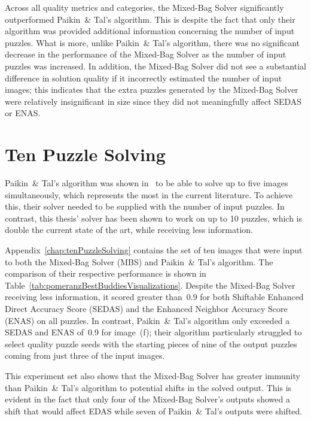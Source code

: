 Across all quality metrics and categories, the Mixed-Bag Solver significantly outperformed Paikin~\& Tal's algorithm.  This is despite the fact that only their algorithm was provided additional information concerning the number of input puzzles.  What is more, unlike Paikin~\& Tal's algorithm, there was no significant decrease in the performance of the Mixed-Bag Solver as the number of input puzzles was increased.  In addition, the Mixed-Bag Solver did not see a substantial difference in solution quality if it incorrectly estimated the number of input images; this indicates that the extra puzzles generated by the Mixed-Bag Solver were relatively insignificant in size since they did not meaningfully affect SEDAS or ENAS.  

\section{Ten Puzzle Solving}

Paikin~\& Tal's algorithm was shown in~\cite{paikin2015} to be able to solve up to five images simultaneously, which represents the most in the current literature.  To achieve this, their solver needed to be supplied with the number of input puzzles.  In contrast, this thesis' solver has been shown to work on up to 10 puzzles, which is double the current state of the art, while receiving less information.

Appendix~\ref{chap:tenPuzzleSolving} contains the set of ten images that were input to both the Mixed-Bag Solver (MBS) and Paikin~\& Tal's algorithm.  The comparison of their respective performance is shown in Table~\ref{tab:pomeranzBestBuddiesVisualizations}.  Despite the Mixed-Bag Solver receiving less information, it scored greater than~0.9 for both Shiftable Enhanced Direct Accuracy Score (SEDAS) and the Enhanced Neighbor Accuracy Score (ENAS) on all puzzles.  In contrast, Paikin~\& Tal's algorithm only exceeded a SEDAS and ENAS of~0.9 for image~(f); their algorithm particularly struggled to select quality puzzle seeds with the starting pieces of nine of the output puzzles coming from just three of the input images.

This experiment set also shows that the Mixed-Bag Solver has greater immunity than Paikin~\& Tal's algorithm to potential shifts in the solved output.  This is evident in the fact that only four of the Mixed-Bag Solver's outputs showed a shift that would affect EDAS while seven of Paikin~\& Tal's outputs were shifted.

